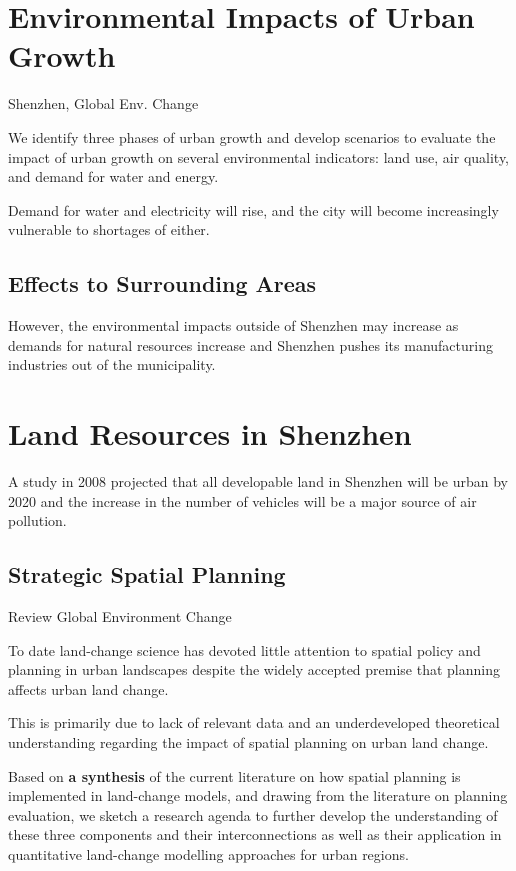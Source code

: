 \documentclass[12pt]{caltech_thesis}
\begin{document}
\begin{bibunit}
\section{Environmental Impacts of Urban Growth}
\citep{Guneralp2008} Shenzhen, Global Env. Change

We identify three phases of urban growth and develop scenarios to evaluate the impact of urban growth on several environmental indicators: land use, air quality, and demand for water and energy. 

Demand for water and electricity will rise, and the city will become increasingly vulnerable to shortages of either. 



\subsection{Effects to Surrounding Areas}
However, the environmental impacts outside of Shenzhen may increase as demands for natural resources increase and Shenzhen pushes its manufacturing industries out of the municipality.\citep{Guneralp2008}


\section{Land Resources in Shenzhen}
A study in 2008 projected that all developable land in Shenzhen will be urban by 2020 and the increase in the number of vehicles will be a major source of air pollution.\citep{Guneralp2008}



\subsection{Strategic Spatial Planning}
\citep{Hersperger2018} Review Global Environment Change

To date land-change science has devoted little attention to spatial policy and planning in urban landscapes despite the widely accepted premise that planning affects urban land change. \citep{Hersperger2018}

This is primarily due to lack of relevant data and an underdeveloped theoretical understanding regarding the impact of spatial planning on urban land change. \citep{Hersperger2018}

Based on \textbf{a synthesis} of the current literature on how spatial planning is implemented in land-change models, and drawing from the literature on planning evaluation, we sketch a research agenda to further develop the understanding of these three components and their interconnections as well as their application in quantitative land-change modelling approaches for urban regions.\citep{Hersperger2018}




\renewcommand{\bibsection}{\section*{\refname}}
\putbib[ownpubs]  %
\end{bibunit}
\end{document}

